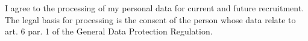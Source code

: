 \cvsubsection{}
\begin{cvparagraph}
\vfill
I agree to the processing of my personal data for current and future recruitment. The legal basis for processing is the consent of the person whose data relate to art. 6 par. 1 of the General Data Protection Regulation.
\end{cvparagraph}
